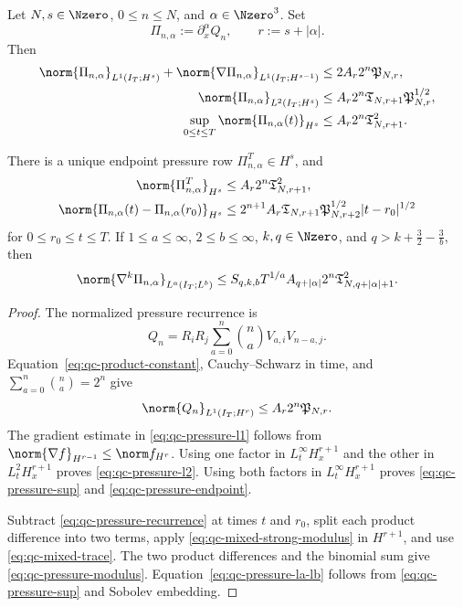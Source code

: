 \begin{theorem}
\label{thm:qc-pressure-rows}
\begin{samepage}
Let \(N,s\in\Nzero\), \(0\le n\le N\), and
\(\alpha\in\Nzero^3\).  Set
\[
 \Pi_{n,\alpha}:=\partial_x^\alpha Q_n,
 \qquad r:=s+|\alpha|.
\]
Then
\begin{align}
 \norm{\Pi_{n,\alpha}}_{L^1(I_T;H^s)}
 +\norm{\nabla\Pi_{n,\alpha}}_{L^1(I_T;H^{s-1})}
 &\le 2A_r2^n\mathfrak P_{N,r},
 \label{eq:qc-pressure-l1}\\
 \norm{\Pi_{n,\alpha}}_{L^2(I_T;H^s)}
 &\le A_r2^n
 \mathfrak T_{N,r+1}\mathfrak P_{N,r}^{1/2},
 \label{eq:qc-pressure-l2}\\
 \sup_{0\le t\le T}\norm{\Pi_{n,\alpha}(t)}_{H^s}
 &\le A_r2^n\mathfrak T_{N,r+1}^2.
 \label{eq:qc-pressure-sup}
\end{align}
\end{samepage}
There is a unique endpoint pressure row \(\Pi_{n,\alpha}^T\in H^s\), and
\begin{align}
 \norm{\Pi_{n,\alpha}^T}_{H^s}
 &\le A_r2^n\mathfrak T_{N,r+1}^2,
 \label{eq:qc-pressure-endpoint}\\
 \norm{\Pi_{n,\alpha}(t)-\Pi_{n,\alpha}(r_0)}_{H^s}
 &\le 2^{n+1}A_r\mathfrak T_{N,r+1}
 \mathfrak P_{N,r+2}^{1/2}|t-r_0|^{1/2}
 \label{eq:qc-pressure-modulus}
\end{align}
for \(0\le r_0\le t\le T\).  If
\(1\le a\le\infty\), \(2\le b\le\infty\),
\(k,q\in\Nzero\), and
\(q>k+\frac32-\frac3b\), then
\begin{equation}
 \norm{\nabla^k\Pi_{n,\alpha}}_{L^a(I_T;L^b)}
 \le
 S_{q,k,b}T^{1/a}A_{q+|\alpha|}2^n
 \mathfrak T_{N,q+|\alpha|+1}^2.
 \label{eq:qc-pressure-la-lb}
\end{equation}
\end{theorem}

\begin{proof}
The normalized pressure recurrence is
\begin{equation}
 Q_n=R_iR_j\sum_{a=0}^{n}\binom na V_{a,i}V_{n-a,j}.
 \label{eq:qc-pressure-recurrence}
\end{equation}
Equation~\eqref{eq:qc-product-constant}, Cauchy--Schwarz in time, and
\(\sum_{a=0}^n\binom na=2^n\) give
\begin{equation}
 \norm{Q_n}_{L^1(I_T;H^r)}
 \le A_r2^n\mathfrak P_{N,r}.
 \label{eq:qc-pressure-L1-sharp}
\end{equation}
The gradient estimate in \eqref{eq:qc-pressure-l1} follows from
\(\norm{\nabla f}_{H^{r-1}}\le\norm f_{H^r}\).
Using one factor in \(L_t^\infty H_x^{r+1}\) and the other in
\(L_t^2H_x^{r+1}\) proves \eqref{eq:qc-pressure-l2}.  Using both factors in
\(L_t^\infty H_x^{r+1}\) proves \eqref{eq:qc-pressure-sup} and
\eqref{eq:qc-pressure-endpoint}.

Subtract \eqref{eq:qc-pressure-recurrence} at times \(t\) and \(r_0\), split
each product difference into two terms, apply
\eqref{eq:qc-mixed-strong-modulus} in \(H^{r+1}\), and use
\eqref{eq:qc-mixed-trace}.  The two product differences and the binomial sum
give \eqref{eq:qc-pressure-modulus}.  Equation~\eqref{eq:qc-pressure-la-lb}
follows from \eqref{eq:qc-pressure-sup} and Sobolev embedding.
\end{proof}

